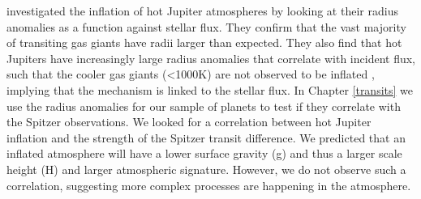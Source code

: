 \citet{Thorngren2018} investigated the inflation of hot Jupiter atmospheres by looking at their radius anomalies as a function against stellar flux. They confirm that the vast majority of transiting gas giants have radii larger than expected. They also find that hot Jupiters have increasingly large radius anomalies that correlate with incident flux, such that the cooler gas giants (<1000K) are not observed to be inflated \citep{Miller2011,Demory2011,Laughlin2011}, implying that the mechanism is linked to the stellar flux. In Chapter \ref{transits} we use the radius anomalies for our sample of planets to test if they correlate with the Spitzer observations. We looked for a correlation between hot Jupiter inflation and the strength of the Spitzer transit difference. We predicted that an inflated atmosphere will have a lower surface gravity (g) and thus a larger scale height (H) and larger atmospheric signature. However, we do not observe such a correlation, suggesting more complex processes are happening in the atmosphere.


%







